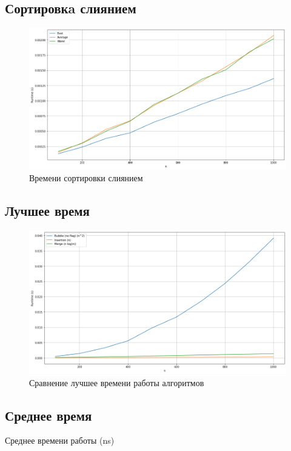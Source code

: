 \subsection*{Сортировкa слиянием}
\begin{figure}[h!]
    \centering
    \includegraphics[width=1\textwidth]{3/inc/p3.png}
    \caption{Времени сортировки слиянием}
\end{figure}


\subsection*{Лучшее время}
\begin{figure}[h!]
    \centering
    \includegraphics[width=1\textwidth]{3/inc/p5.png}
    \caption{Сравнение лучшее времени работы алгоритмов}
\end{figure}

\clearpage
\subsection*{Среднее время}

\begin{table}[h]
    \centering
    \caption{\label{tabular:benchmark} Среднее времени работы (ns)}
\end{table}

